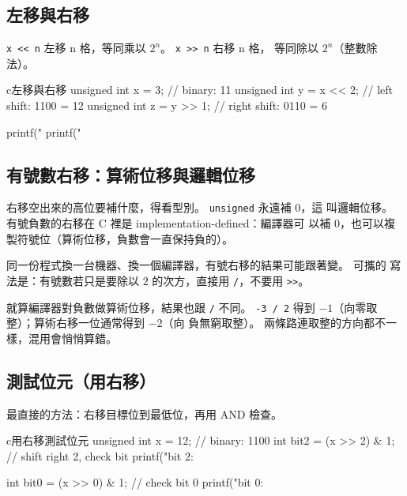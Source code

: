 \subsection{左移與右移}

\texttt{x << n} 左移 n 格，等同乘以 $2^n$。 \texttt{x >> n} 右移 n 格，
等同除以 $2^n$（整數除法）。

\begin{code}{c}{左移與右移}
unsigned int x = 3;   // binary: 11
unsigned int y = x << 2; // left shift: 1100 = 12
unsigned int z = y >> 1; // right shift: 0110 = 6

printf("%
printf("%
\end{code}


\subsection{有號數右移：算術位移與邏輯位移}

右移空出來的高位要補什麼，得看型別。 \texttt{unsigned} 永遠補 $0$，這
叫邏輯位移。 有號負數的右移在 C 裡是 implementation-defined：編譯器可
以補 $0$，也可以複製符號位（算術位移，負數會一直保持負的）。

同一份程式換一台機器、換一個編譯器，有號右移的結果可能跟著變。 可攜的
寫法是：有號數若只是要除以 $2$ 的次方，直接用 \texttt{/}，不要用
\texttt{>>}。

就算編譯器對負數做算術位移，結果也跟 \texttt{/} 不同。
\texttt{-3 / 2} 得到 $-1$（向零取整）；算術右移一位通常得到 $-2$（向
負無窮取整）。 兩條路連取整的方向都不一樣，混用會悄悄算錯。

\subsection{測試位元（用右移）}

最直接的方法：右移目標位到最低位，再用 AND 檢查。

\begin{code}{c}{用右移測試位元}
unsigned int x = 12;  // binary: 1100
int bit2 = (x >> 2) & 1;  // shift right 2, check bit
printf("bit 2: %

int bit0 = (x >> 0) & 1;  // check bit 0
printf("bit 0: %
\end{code}

